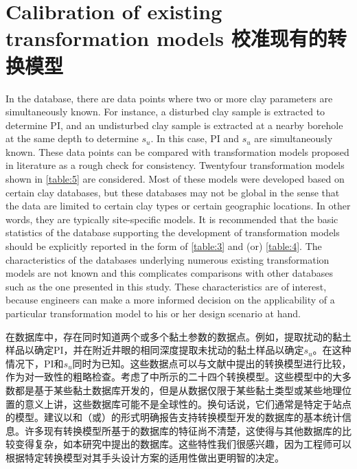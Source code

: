 \section{Calibration of existing transformation models 校准现有的转换模型}

\begin{paracol}{2}
        
    In the database, there are data points where two or more clay parameters are simultaneously known. For instance, a disturbed clay sample is extracted to determine PI, and an undisturbed clay sample is extracted at a nearby borehole at the same depth to determine $s_u$. In this case, PI and $s_u$ are simultaneously known. These data points can be compared with transformation models proposed in literature as a rough check for consistency. Twentyfour transformation models shown in \autoref{table:5} are considered. Most of these models were developed based on certain clay databases, but these databases may not be global in the sense that the data are limited to certain clay types or certain geographic locations. In other words, they are typically site-specific models. It is recommended that the basic statistics of the database supporting the development of transformation models should be explicitly reported in the form of \autoref{table:3} and (or) \autoref{table:4}. The characteristics of the databases underlying numerous existing transformation models are not known and this complicates comparisons with other databases such as the one presented in this study. These characteristics are of interest, because engineers can make a more informed decision on the applicability of a particular transformation model to his or her design scenario at hand.
    
    \switchcolumn
        
    在数据库中，存在同时知道两个或多个黏土参数的数据点。例如，提取扰动的黏土样品以确定PI，并在附近井眼的相同深度提取未扰动的黏土样品以确定$s_u$。在这种情况下，PI和$s_u$同时为已知。这些数据点可以与文献中提出的转换模型进行比较，作为对一致性的粗略检查。考虑了中所示的二十四个转换模型。这些模型中的大多数都是基于某些黏土数据库开发的，但是从数据仅限于某些黏土类型或某些地理位置的意义上讲，这些数据库可能不是全球性的。换句话说，它们通常是特定于站点的模型。建议以和（或）的形式明确报告支持转换模型开发的数据库的基本统计信息。许多现有转换模型所基于的数据库的特征尚不清楚，这使得与其他数据库的比较变得复杂，如本研究中提出的数据库。这些特性我们很感兴趣，因为工程师可以根据特定转换模型对其手头设计方案的适用性做出更明智的决定。
    

\end{paracol}
